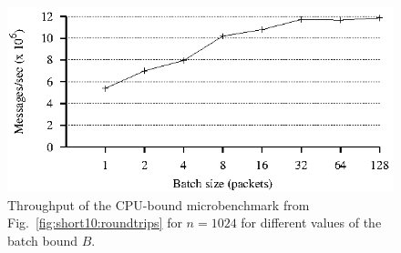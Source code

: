 \begin{figure}
\begin{centering}
\includegraphics{figs/batch.eps}
\caption{Throughput of the CPU-bound microbenchmark from Fig.~\ref{fig:short10:roundtrips} for $n=1024$ for different values of the batch bound $B$.}
\label{fig:batch}
\end{centering}
\end{figure}

